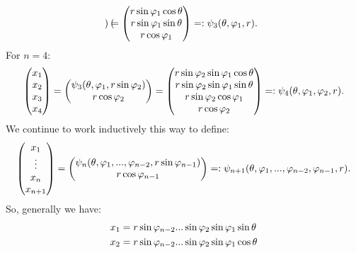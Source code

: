 \begin{problem}
\begin{solution}
\begin{itemize}
\begin{align*}
\begin{pmatrix}
        \end{pmatrix}
        =
        \begin{pmatrix}
            r\sin\varphi_1 \cos\theta \\
            r\sin\varphi_1 \sin\theta \\
            r\cos\varphi_1
        \end{pmatrix}
        =: \psi_3 (\theta, \varphi_1, r).
    \end{align*}
    For $n=4$:
    \begin{align*}
        \begin{pmatrix}
            x_1 \\ x_2 \\ x_3 \\ x_4
        \end{pmatrix}
        = 
        \begin{pmatrix}
            \psi_3 (\theta, \varphi_1, r\sin\varphi_2) \\
            r\cos\varphi_2
        \end{pmatrix}
        =
        \begin{pmatrix}
            r\sin\varphi_2 \sin\varphi_1 \cos\theta \\
            r\sin\varphi_2 \sin\varphi_1 \sin\theta \\
            r\sin\varphi_2\cos\varphi_1 \\
            r\cos\varphi_2
        \end{pmatrix}
        =: \psi_4 (\theta, \varphi_1, \varphi_2, r).
    \end{align*}
    We continue to work inductively this way to define:
    \begin{align*}
        \begin{pmatrix}
            x_1 \\ \vdots \\ x_n \\ x_{n+1}
        \end{pmatrix}
        =
        \begin{pmatrix}
            \psi_n (\theta, \varphi_1,..., \varphi_{n-2}, r\sin\varphi_{n-1}) \\
            r\cos\varphi_{n-1} 
        \end{pmatrix}
        =: \psi_{n+1} (\theta, \varphi_1,...,\varphi_{n-2},\varphi_{n-1}, r).
    \end{align*}
    So, generally we have:
    \begin{align*}
        x_1 &= r\sin \vp_{n-2} ...\sin \vp_{2} \sin \vp_1 \sin \theta\\
        x_2 &= r\sin \vp_{n-2} ... \sin \vp_2 \sin \vp_1 \cos \theta \\

\end{align*}
\end{itemize}
\end{solution}
\end{problem}
